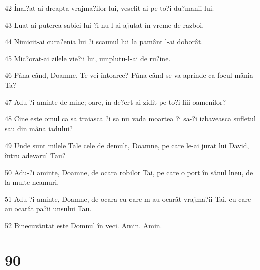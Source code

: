 \par 42 Înal?at-ai dreapta vrajma?ilor lui, veselit-ai pe to?i du?manii lui.
\par 43 Luat-ai puterea sabiei lui ?i nu l-ai ajutat în vreme de razboi.
\par 44 Nimicit-ai cura?enia lui ?i scaunul lui la pamânt l-ai doborât.
\par 45 Mic?orat-ai zilele vie?ii lui, umplutu-l-ai de ru?ine.
\par 46 Pâna când, Doamne, Te vei întoarce? Pâna când se va aprinde ca focul mânia Ta?
\par 47 Adu-?i aminte de mine; oare, în de?ert ai zidit pe to?i fiii oamenilor?
\par 48 Cine este omul ca sa traiasca ?i sa nu vada moartea ?i sa-?i izbaveasca sufletul sau din mâna iadului?
\par 49 Unde sunt milele Tale cele de demult, Doamne, pe care le-ai jurat lui David, întru adevarul Tau?
\par 50 Adu-?i aminte, Doamne, de ocara robilor Tai, pe care o port în sânul lneu, de la multe neamuri.
\par 51 Adu-?i aminte, Doamne, de ocara cu care m-au ocarât vrajma?ii Tai, cu care au ocarât pa?ii unsului Tau.
\par 52 Binecuvântat este Domnul în veci. Amin. Amin.

\chapter{90}

